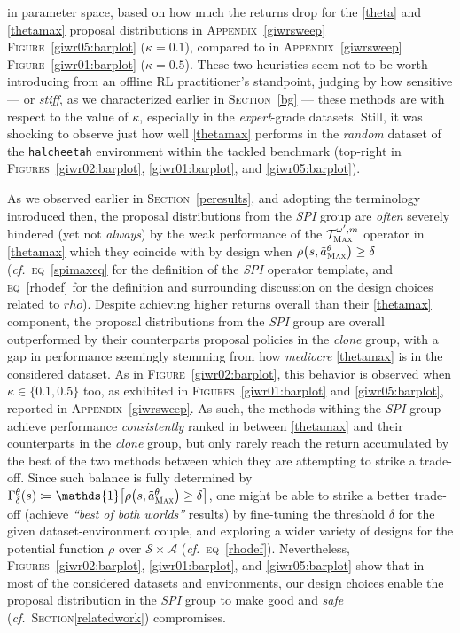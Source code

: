 in parameter space, based on how much the returns drop for the \ref{theta} and \ref{thetamax}
proposal distributions in \textsc{Appendix}~\ref{giwrsweep} \textsc{Figure}~\ref{giwr05:barplot}
($\kappa=0.1$),
compared to in \textsc{Appendix}~\ref{giwrsweep} \textsc{Figure}~\ref{giwr01:barplot}
($\kappa=0.5$).
These two heuristics seem not to be worth introducing from an offline RL practitioner's standpoint,
judging by how sensitive --- or \emph{stiff}, as we characterized earlier in \textsc{Section}~\ref{bg} ---
these methods are with respect to the value of $\kappa$,
especially in the \textit{expert}-grade datasets.
Still, it was shocking to observe just how well \ref{thetamax} performs in the \textit{random} dataset of the
\texttt{halcheetah} environment within the tackled benchmark (top-right in \textsc{Figures}~\ref{giwr02:barplot},
\ref{giwr01:barplot}, and \ref{giwr05:barplot}).

As we observed earlier in \textsc{Section}~\ref{peresults},
and adopting the terminology introduced then,
the proposal distributions from the \textit{SPI} group are \emph{often} severely hindered
(yet not \emph{always})
by the weak performance of the $\mathcal{T}_\textsc{Max}^{\omega', m}$ operator in \ref{thetamax}
which they coincide with by design when
$\rho \big(s, \tilde{a}^\theta_\textsc{Max}\big) \geq \delta$
(\textit{cf.}~\textsc{eq}~\ref{spimaxeq} for the definition of the \textit{SPI} operator template,
and \textsc{eq}~\ref{rhodef} for the definition and surrounding discussion on the design choices related to $rho$).
Despite achieving higher returns overall than their \ref{thetamax} component,
the proposal distributions from the \textit{SPI} group are overall outperformed by their counterparts
proposal policies in the \textit{clone} group, with a gap in performance seemingly stemming from how \emph{mediocre}
\ref{thetamax} is in the considered dataset.
As in \textsc{Figure}~\ref{giwr02:barplot}, this behavior is observed when $\kappa \in \{0.1, 0.5\}$ too,
as exhibited in
\textsc{Figures}~\ref{giwr01:barplot} and \ref{giwr05:barplot},
reported in \textsc{Appendix}~\ref{giwrsweep}.
As such, the methods withing the \textit{SPI} group achieve performance \emph{consistently} ranked in between
\ref{thetamax} and their counterparts in the \textit{clone} group, but only rarely reach the return
accumulated by the best of the two methods between which they are attempting to strike a trade-off.
Since such balance is fully determined by $\Gamma^\theta_\delta(s) \coloneqq
\mathds{1}\big[\rho \big(s, \tilde{a}^\theta_\textsc{Max}\big) \geq \delta \big]$,
one might be able to strike a better trade-off (achieve \emph{``best of both worlds''} results)
by fine-tuning the threshold $\delta$ for the given dataset-environment couple,
and exploring a wider variety of designs for the potential function $\rho$ over $\mathcal{S} \times \mathcal{A}$
(\textit{cf.}~\textsc{eq}~\ref{rhodef}).
Nevertheless, \textsc{Figures}~\ref{giwr02:barplot}, \ref{giwr01:barplot}, and \ref{giwr05:barplot} show that
in most of the considered datasets and environments,
our design choices enable the proposal distribution in the \textit{SPI} group to make good
and \emph{safe} (\textit{cf.}~\textsc{Section}\ref{relatedwork})
compromises.


